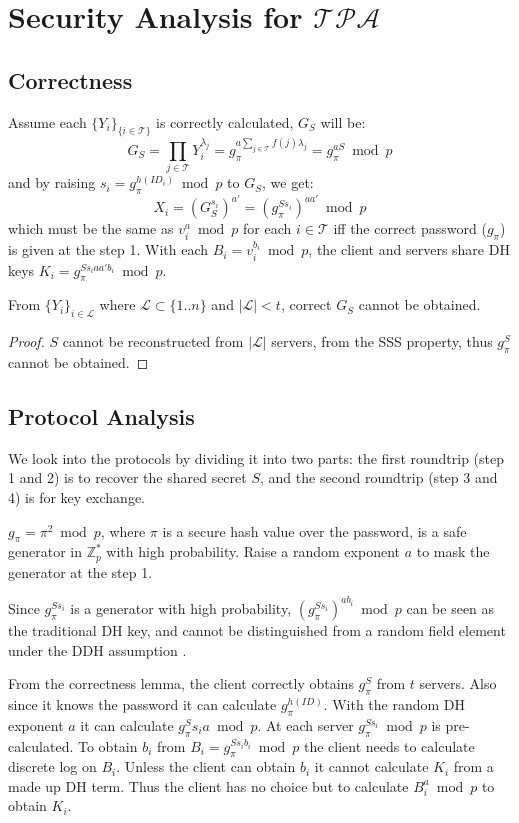 \section{Security Analysis for $\mathcal{TPA}$}
\label{tpa}
\subsection{Correctness}
Assume each $\{Y_i\}_{\{i \in \mathcal{T}\}}$ is correctly calculated,
$G_S$ will be:
\[
  G_S = \prod_{j \in \mathcal{T}}Y_i^{\lambda_j} = g_{\pi}^{a \sum_{j
      \in \mathcal{T}} f(j) \lambda_j} = g_{\pi}^{aS} \bmod p
\]
and by raising $s_i = g_{\pi}^{h(ID_i)} \bmod p$ to $G_S$, we get:
\[
  X_i = (G_S^{s_i})^{a'} = (g_{\pi}^{Ss_i})^{aa'} \bmod p
\]
which must be the same as $v_i^{a} \bmod p$ for each $i \in
\mathcal{T}$ iff the correct password ($g_{\pi}$) is given at the
step 1. With each $B_i = v_i^{b_i} \bmod p$, the client and servers
share DH keys $K_i = g_{\pi}^{Ss_iaa'b_i} \bmod p$.

\begin{lemma}
\label{tpa1}
From $\{Y_i\}_{i \in \mathcal{L}}$ where $\mathcal{L} \subset \{1..n\}$ and $|\mathcal{L}| <
t$, correct $G_S$ cannot be obtained.
\end{lemma}

\begin{proof}
$S$ cannot be reconstructed from $|\mathcal{L}|$ servers, from the SSS
  property, thus $g_{\pi}^S$ cannot be obtained.
\end{proof}

\subsection{Protocol Analysis}
We look into the protocols by dividing it into two parts: the first
roundtrip (step 1 and 2) is to recover the shared secret $S$, and
the second roundtrip (step 3 and 4) is for key exchange.

$g_{\pi} = \pi^2 \bmod p$, where $\pi$ is a secure hash value over the
password, is a safe generator in $\mathbb{Z}^*_p$ with high
probability. Raise a random exponent $a$ to mask the generator at the
step 1. 

Since $g_{\pi}^{Ss_i}$ is a generator with high probability,
$(g_{\pi}^{Ss_i})^{ab_i} \bmod p$ can be seen as the traditional DH
key, and cannot be distinguished from a random field element under the
DDH assumption \cite{boneh}.

From the correctness lemma, the client correctly obtains
$g_{\pi}^S$ from $t$ servers. Also since it knows the password it can
calculate $g_{\pi}^{h(ID)}$. With the random DH exponent $a$ it can
calculate $g_{\pi}^Ss_ia \bmod p$. At each server $g_{\pi}^{Ss_i}
\bmod p$ is pre-calculated. To obtain $b_i$ from $B_i =
g_{\pi}^{Ss_ib_i} \bmod p$ the client needs to calculate discrete log
on $B_i$. Unless the client can obtain $b_i$ it cannot calculate $K_i$
from a made up DH term. Thus the client has no choice but to calculate
$B_i^a \bmod p$ to obtain $K_i$.

